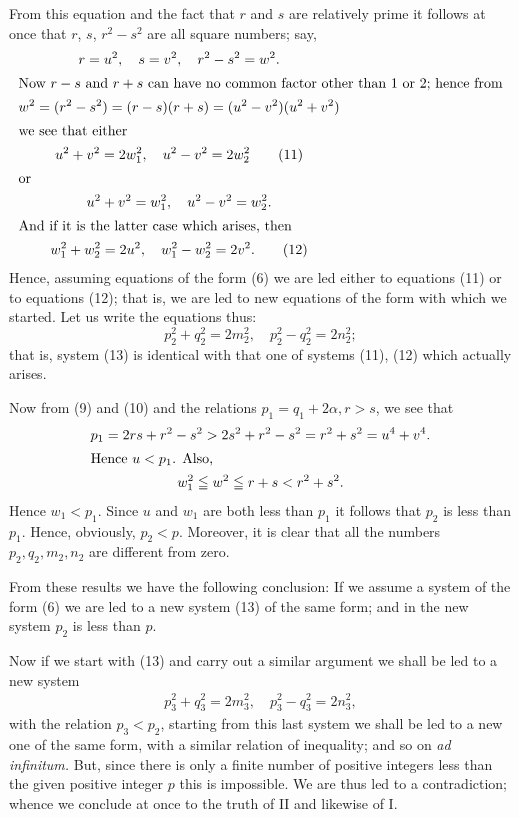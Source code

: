 \documentclass[oneside]{book}
\begin{document}
From this equation and the fact that $r$ and $s$ are relatively
prime it follows at once that $r$, $s$, $r^2 - s^2$ are all square
numbers; say,
\begin{gather}
r = u^2,\quad s = v^2,\quad r^2 - s^2 = w^2. \notag \\
\intertext{Now $r - s$ and $r + s$ can have no common factor other
than 1 or 2; hence from}
w^2 = (r^2-s^2) = (r-s)(r+s) = (u^2-v^2)(u^2+v^2) \notag \\
\intertext{we see that either}
u^2 + v^2 = 2w_1^2,\quad  u^2 - v^2 = 2w_2^2 \tag{11} \\
\intertext{or}
u^2 + v^2 = w_1^2,\quad u^2 - v^2 = w_2^2. \notag \\
\intertext{And if it is the latter case which arises, then}
w_1^2 + w_2^2 = 2u^2,\quad w_1^2 - w_2^2 = 2v^2. \tag{12}
\end{gather}
Hence, assuming equations of the form (6) we are led either to
equations (11) or to equations (12); that is, we are led to new
equations of the form with which we started. Let us write the
equations thus:
\begin{equation}
p_2^2 + q_2^2 = 2m_2^2,\quad p_2^2 - q_2^2 = 2n_2^2; \tag{13}
\end{equation}
that is, system (13) is identical with that one of systems (11),
(12) which actually arises.

Now from (9) and (10) and the relations $p_1 = q_1 + 2\alpha, r
> s$, we see that
\begin{gather*}
p_1 = 2rs + r^2 - s^2 > 2s^2 + r^2 - s^2 =
   r^2 + s^2 = u^4 + v^4. \\
\intertext{Hence $u < p_1$. Also,}
w_1^2 \leqq w^2 \leqq r+s < r^2 + s^2.
\end{gather*}
Hence $w_1 < p_1$. Since $u$ and $w_1$ are both less than $p_1$ it
follows that $p_2$ is less than $p_1$. Hence, obviously, $p_2 < p$.
Moreover, it is clear that all the numbers $p_2, q_2, m_2, n_2$ are
different from zero.

From these results we have the following conclusion: If we assume a
system of the form (6) we are led to a new system (13) of the same
form; and in the new system $p_2$ is less than $p$.

Now if we start with (13) and carry out a similar argument
we shall be led to a new system
\begin{gather*}
p_3^2 + q_3^2 = 2m_3^2,\quad p_3^2 - q_3^2 = 2n_3^2,
\end{gather*}
with the relation $p_3 < p_2$, starting from this last system we
shall be led to a new one of the same form, with a similar relation
of inequality; and so on \emph{ad infinitum.} But, since there is
only a finite number of positive integers less than the given
positive integer $p$ this is impossible. We are thus led to a
contradiction; whence we conclude at once to the truth of II and
likewise of I.
\end{document}
